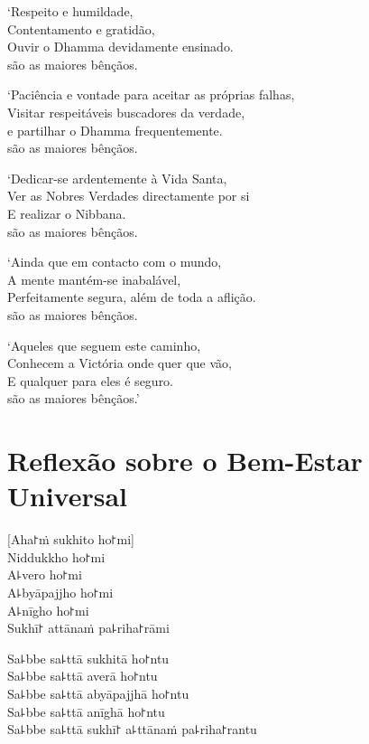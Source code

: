 `Respeito e humildade,\\
Contentamento e gratidão,\\
Ouvir o Dhamma devidamente ensinado.\\
 são as maiores bênçãos.

`Paciência e vontade para aceitar as próprias falhas,\\
Visitar respeitáveis buscadores da verdade,\\
e partilhar o Dhamma frequentemente.\\
 são as maiores bênçãos.

\clearpage

`Dedicar-se ardentemente à Vida Santa,\\
Ver as Nobres Verdades directamente por si\\
E realizar o Nibbana.\\
 são as maiores bênçãos.

`Ainda que em contacto com o mundo,\\
A mente mantém-se inabalável,\\
Perfeitamente segura, além de toda a aflição.\\
 são as maiores bênçãos.

`Aqueles que seguem este caminho,\\
Conhecem a Victória onde quer que vão,\\
E qualquer  para eles é seguro.\\
 são as maiores bênçãos.'

\chapter*[Bem-Estar Universal]{Reflexão sobre o Bem-Estar Universal}

\delegateSetUseNext


\begin{leader}
\end{leader}

[Aha꜓ṁ sukhito ho꜓mi]\\
Niddukkho ho꜓mi\\
A꜕vero ho꜓mi\\
A꜕byāpajjho ho꜓mi\\
A꜕nīgho ho꜓mi\\
Sukhī꜓ attānaṁ pa꜕riha꜓rāmi

Sa꜕bbe sa꜕ttā sukhitā ho꜓ntu\\
Sa꜕bbe sa꜕ttā averā ho꜓ntu\\
Sa꜕bbe sa꜕ttā abyāpajjhā ho꜓ntu\\
Sa꜕bbe sa꜕ttā anīghā ho꜓ntu\\
Sa꜕bbe sa꜕ttā sukhī꜓ a꜕ttānaṁ pa꜕riha꜓rantu

